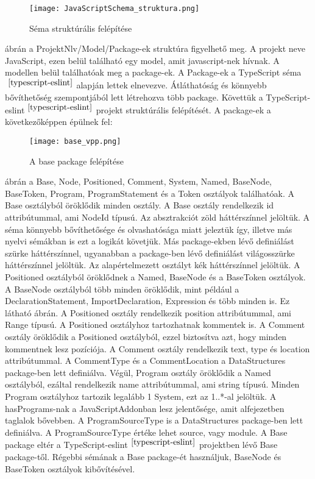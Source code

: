 \begin{figure}[!htbp]
      \caption{Séma struktúrális felépítése}\label{fig:JavaScriptSchema_struktura}
      \centering
      \texttt{[image: JavaScriptSchema\_struktura.png]}
\end{figure}

 ábrán a ProjektNlv/Model/Package-ek struktúra figyelhető meg.
A projekt neve JavaScript, ezen belül található egy model, amit javascript-nek hívnak.
A modellen belül találhatóak meg a package-ek.
A Package-ek a TypeScript séma $^{~\cite{typescript-eslint}}$ alapján lettek elnevezve.
Átláthatóság és könnyebb bővíthetőség szempontjából lett létrehozva több package.
Követtük a TypeScript-eslint$^{~\cite{typescript-eslint}}$ projekt struktúrális felépítését.
A package-ek a következőképpen épülnek fel:
\begin{figure}[!htbp]
      \caption{A base package felépítése}\label{fig:base_vpp}
      \centering
      \texttt{[image: base\_vpp.png]}
\end{figure}

 ábrán a Base, Node, Positioned, Comment, System, Named, BaseNode, BaseToken, Program, ProgramStatement és a Token osztályok találhatóak.
A Base osztályból öröklődik minden osztály.
A Base osztály rendelkezik id attribútummal, ami NodeId típusú.
Az absztrakciót zöld háttérszínnel jelöltük.
A séma könnyebb bővíthetősége és olvashatósága miatt jeleztük így, illetve más nyelvi sémákban is ezt a logikát követjük.
Más package-ekben lévő definiálást szürke háttérszínnel, ugyanabban a package-ben lévő definiálást világosszürke háttérszínnel jelöltük.
Az alapértelmezett osztályt kék háttérszínnel jelöltük.
A Positioned osztályból öröklődnek a Named, BaseNode és a BaseToken osztályok.
A BaseNode osztályból több minden öröklődik, mint például a DeclarationStatement, ImportDeclaration, Expression és több minden is. Ez látható  ábrán.
A Positioned osztály rendelkezik position attribútummal, ami Range típusú. A Positioned osztályhoz tartozhatnak kommentek is.
A Comment osztály öröklődik a Positioned osztályból, ezzel biztosítva azt, hogy minden kommentnek lesz pozíciója.
A Comment osztály rendelkezik text, type és location attribútummal.
A CommentType és a CommentLocation a DataStructures package-ben lett definiálva.
Végül, Program osztály öröklődik a Named osztályból, ezáltal rendelkezik name attribútummal, ami string típusú.
Minden Program osztályhoz tartozik legalább 1 System, ezt az 1..*-al jelöltük.
A hasPrograms-nak a JavaScriptAddonban lesz jelentősége, amit  alfejezetben taglalok bővebben.
A ProgramSourceType is a DataStructures package-ben lett definiálva. A ProgramSourceType értéke lehet source, vagy module.
A Base package eltér a TypeScript-eslint$^{~\cite{typescript-eslint}}$ projektben lévő Base package-től.
Régebbi sémának a Base package-ét használjuk, BaseNode és BaseToken osztályok kibővítésével.

